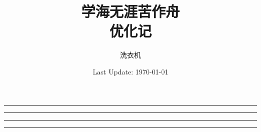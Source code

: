 \newtheorem{property}{性质}[section]
\makeatletter
\renewcommand*{\maketitle}{
	\begin{titlepage}
		\centering
		\vspace*{5\baselineskip}
		
		\rule{\textwidth}{1.6pt}\vspace*{-\baselineskip}\vspace*{2pt}
		\rule{\textwidth}{0.4pt}
		
		\vspace{0.75\baselineskip}
		
		{\LARGE\bfseries \@title}
		
		\vspace{0.75\baselineskip}
		
		\rule{\textwidth}{0.4pt}\vspace*{-\baselineskip}\vspace{3.2pt}
		\rule{\textwidth}{1.6pt}
		
		\vspace{4\baselineskip}
		
		{\Large \@author}
		
		\vspace{0.35\baselineskip}	
		
		{\Large \@date}
		\vfill
	\end{titlepage}
}
\makeatother
\title{学海无涯苦作舟 \\[20pt]
	\Large 优化记
}
\author{洗衣机}
\date{Last Update: \today}

	\maketitle
	\clearpage
	\tableofcontents  %
    \clearpage
